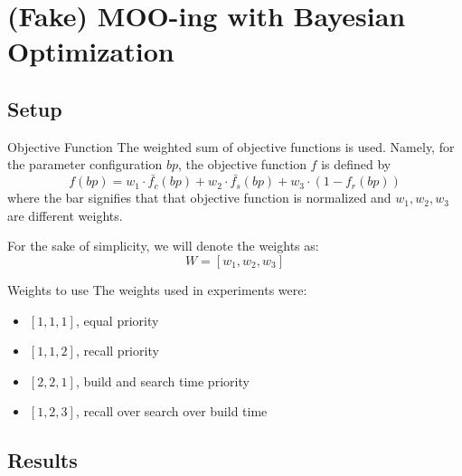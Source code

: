 \section{(Fake) MOO-ing with Bayesian Optimization}

\frame{\insertsection}

\subsection{Setup}

\begin{frame}{Objective Function}
    The weighted sum of objective functions is used. Namely, for the parameter configuration \(bp\), the objective function \(f\) is defined by
    \[
        f(bp) = w_1 \cdot \bar{f_c}(bp) + w_2 \cdot \bar{f_s}(bp) + w_3 \cdot (1 - f_r(bp))
    \]
    where the bar signifies that that objective function is normalized and \(w_1, w_2, w_3\) are different weights.

    For the sake of simplicity, we will denote the weights as:
    \[
        W = [w_1, w_2, w_3]
    \]
\end{frame}

\begin{frame}{Weights to use}
    The weights used in experiments were:
    \begin{itemize}
        \item \([1, 1, 1]\), equal priority
        \item \([1, 1, 2]\), recall priority
        \item \([2, 2, 1]\), build and search time priority
        \item \([1, 2, 3]\), recall over search over build time
    \end{itemize}
\end{frame}

\subsection{Results}

